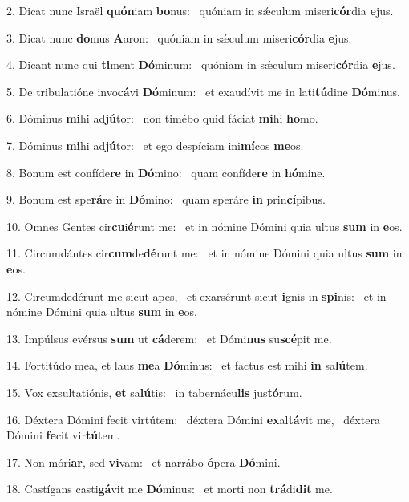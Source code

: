 2. Dicat nunc Israël \textbf{quón}iam \textbf{bo}nus: \ast\  quóniam in sǽculum miseri\textbf{cór}dia \textbf{e}jus.\

3. Dicat nunc \textbf{do}mus \textbf{A}aron: \ast\  quóniam in sǽculum miseri\textbf{cór}dia \textbf{e}jus.\

4. Dicant nunc qui \textbf{ti}ment \textbf{Dó}minum: \ast\  quóniam in sǽculum miseri\textbf{cór}dia \textbf{e}jus.\

5. De tribulatióne invo\textbf{cá}vi \textbf{Dó}minum: \ast\  et exaudívit me in lati\textbf{tú}dine \textbf{Dó}minus.\

6. Dóminus \textbf{mi}hi ad\textbf{jú}tor: \ast\  non timébo quid fáciat \textbf{mi}hi \textbf{ho}mo.\

7. Dóminus \textbf{mi}hi ad\textbf{jú}tor: \ast\  et ego despíciam ini\textbf{mí}cos \textbf{me}os.\

8. Bonum est confíde\textbf{re} in \textbf{Dó}mino: \ast\  quam confíde\textbf{re} in \textbf{hó}mine.\

9. Bonum est spe\textbf{rá}re in \textbf{Dó}mino: \ast\  quam speráre \textbf{in} prin\textbf{cí}pibus.\

10. Omnes Gentes cir\textbf{cu}i\textbf{é}runt me: \ast\  et in nómine Dómini quia ultus \textbf{sum} in \textbf{e}os.\

11. Circumdántes cir\textbf{cum}de\textbf{dé}runt me: \ast\  et in nómine Dómini quia ultus \textbf{sum} in \textbf{e}os.\

12. Circumdedérunt me sicut apes, \dag\  et exarsérunt sicut \textbf{i}gnis in \textbf{spi}nis: \ast\  et in nómine Dómini quia ultus \textbf{sum} in \textbf{e}os.\

13. Impúlsus evérsus \textbf{sum} ut \textbf{cá}derem: \ast\  et Dómi\textbf{nus} su\textbf{scé}pit me.\

14. Fortitúdo mea, et laus \textbf{me}a \textbf{Dó}minus: \ast\  et factus est mihi \textbf{in} sa\textbf{lú}tem.\

15. Vox exsultatiónis, \textbf{et} sa\textbf{lú}tis: \ast\  in tabernácu\textbf{lis} jus\textbf{tó}rum.\

16. Déxtera Dómini fecit virtútem: \dag\  déxtera Dómini \textbf{ex}al\textbf{tá}vit me, \ast\  déxtera Dómini \textbf{fe}cit vir\textbf{tú}tem.\

17. Non móri\textbf{ar}, sed \textbf{vi}vam: \ast\  et narrábo \textbf{ó}pera \textbf{Dó}mini.\

18. Castígans casti\textbf{gá}vit me \textbf{Dó}minus: \ast\  et morti non \textbf{trá}di\textbf{dit} me.\

